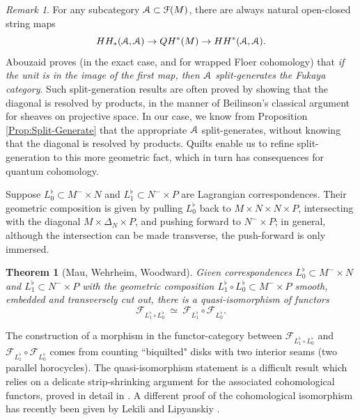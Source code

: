 \documentclass[reqno,10pt]{amsart}
\numberwithin{equation}{section}
\newcommand{\scrF}{\EuScript{F}}
\newcommand{\scrA}{\EuScript{A}}
\newcommand{\cF}{{\mathcal F}}
\newtheorem{Theorem}[thm]{Theorem}
\theoremstyle{remark}
\newtheorem{Remark}[thm]{Remark}
\begin{document}
\begin{Remark}
For any subcategory $\scrA \subset \scrF(M)$, there are always natural open-closed string maps
\[
HH_*(\scrA,\scrA) \rightarrow QH^*(M) \rightarrow HH^*(\scrA,\scrA).
\]
Abouzaid \cite{Abouzaid} proves (in the exact case, and for wrapped Floer cohomology) that \emph{if the unit is in the image of the first map, then $\scrA$ split-generates the Fukaya category}.  Such split-generation results are often proved by showing that the diagonal is resolved by products, in the manner of Beilinson's classical argument for sheaves on projective space.  In our case, we know from Proposition \ref{Prop:Split-Generate} that the appropriate $\scrA$ split-generates, without knowing that the diagonal is resolved by products.  Quilts enable us to refine split-generation to this more geometric fact, which in turn has consequences for quantum cohomology. 
\end{Remark}


Suppose $L_0^{\flat} \subset M^-\times N$ and $L_1^{\flat}\subset N^-\times P$ are Lagrangian correspondences. Their  geometric composition is given by pulling $L_0^{\flat}$ back to $M\times N\times N\times P$, intersecting with the diagonal $M \times \Delta_N \times P$, and pushing forward to $N^-\times P$; in general, although the intersection can be made transverse, the push-forward is only immersed. 

\begin{Theorem}[Mau, Wehrheim, Woodward] \label{Thm:QuiltsCompose}
Given correspondences $L_0^{\flat} \subset M^-\times N$ and $L_1^{\flat}\subset N^-\times P$ with the geometric composition $L_1^{\flat} \circ L_0^{\flat} \subset M^-\times P$ smooth, embedded and transversely cut out, there is a quasi-isomorphism of functors 
\[
\cF_{L_1^{\flat}\circ L_0^{\flat}} \ \simeq \  \cF_{L_1^{\flat}} \circ \cF_{L_0^{\flat}}.
\]
\end{Theorem}

The construction of a morphism in the functor-category between $\cF_{L_1^{\flat}\circ L_0^{\flat}}$ and $\cF_{L_1^{\flat}} \circ \cF_{L_0^{\flat}}$ comes from counting ``biquilted" disks with two interior seams (two parallel horocycles). The quasi-isomorphism statement is a  difficult result which relies on a delicate strip-shrinking argument  for the associated cohomological functors, proved in detail in \cite{WW2}. A different proof of the cohomological isomorphism has recently been given by Lekili and Lipyanskiy \cite{LekiliLipyanskiy}.
\end{document}
